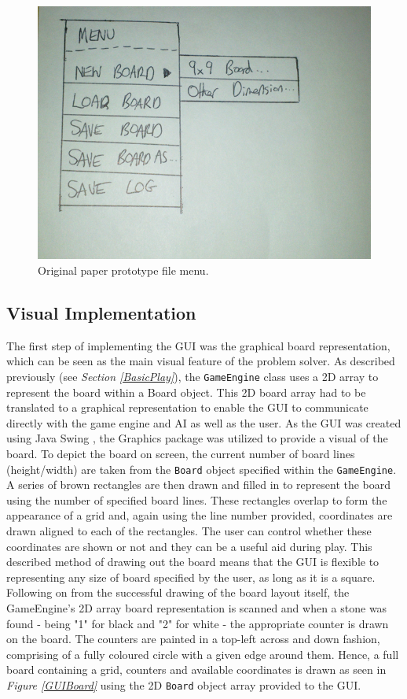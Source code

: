 \documentclass{l3proj}
\begin{document}
\begin{figure}[H]
\centering
\includegraphics[scale=0.4]{Images/GUI-2-PP.png}
\caption{Original paper prototype file menu.}
\label{GUIPP2}
\end{figure}

\subsection{Visual Implementation}

The first step of implementing the GUI was the graphical board representation, which can be seen as the main visual feature of the problem solver. As described previously (see \textit{Section \ref{BasicPlay}}), the \texttt{GameEngine} class uses a 2D array to represent the board within a Board object. This 2D board array had to be translated to a graphical representation to enable the GUI to communicate directly with the game engine and AI as well as the user. As the GUI was created using Java Swing \cite{Swing}, the Graphics package \cite{Graphics} was utilized to provide a visual of the board. To depict the board on screen, the current number of board lines (height/width) are taken from the \texttt{Board} object specified within the \texttt{GameEngine}. A series of brown rectangles are then drawn and filled in to represent the board using the number of specified board lines. These rectangles overlap to form the appearance of a grid and, again using the line number provided, coordinates are drawn aligned to each of the rectangles. The user can control whether these coordinates are shown or not and they can be a useful aid during play. This described method of drawing out the board means that the GUI is flexible to representing any size of board specified by the user, as long as it is a square. Following on from the successful drawing of the board layout itself, the GameEngine's 2D array board representation is scanned and when a stone was found - being "1" for black and "2" for white - the appropriate counter is drawn on the board. The counters are painted in a top-left across and down fashion, comprising of a fully coloured circle with a given edge around them. Hence, a full board containing a grid, counters and available coordinates is drawn as seen in \textit{Figure \ref{GUIBoard}} using the 2D \texttt{Board} object array provided to the GUI.
\end{document}
